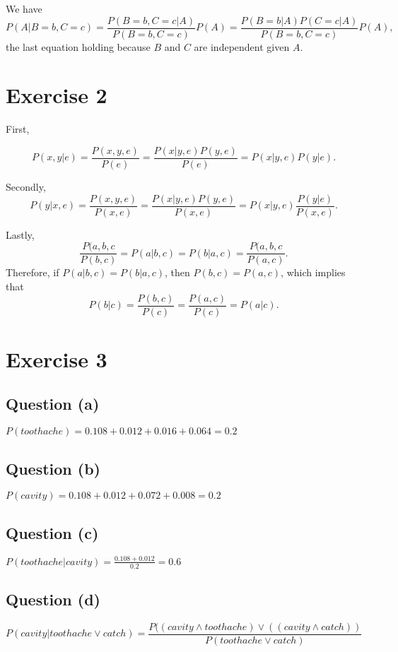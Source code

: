 \documentclass{article}
\begin{document}
\bigskip
We have 
\begin{equation}
P(A|B=b, C=c) = \frac{P(B=b, C=c |A)}{P(B=b, C=c)}P(A)=\frac{P(B=b|A)P(C=c|A)}{P(B=b, C=c)}P(A),
\end{equation}
the  last equation holding because $B$ and $C$ are independent given $A$. 

\section{Exercise 2}

First, 

\begin{equation}
P(x,y|e)= \frac{P(x,y,e)}{P(e)}= \frac{P(x|y, e)P(y, e)}{P(e)}= P(x|y, e)P(y|e).
\end{equation}

Secondly, 
\begin{equation}
P(y|x, e)= \frac{P(x,y,e)}{P(x, e)}= \frac{P(x|y, e)P(y, e)}{P(x,e)}= P(x|y, e)\frac{P(y|e)}{P(x, e)}.
\end{equation}

Lastly,
\begin{equation}
\frac{P(a,b,c}{P(b,c)}=P(a|b,c)=P(b|a, c)= \frac{P(a,b,c}{P(a,c)}.
\end{equation}
Therefore, if $P(a|b,c)=P(b|a, c)$, then $P(b,c)=P(a,c)$, which implies that
\begin{equation}
P(b|c)=\frac{P(b,c)}{P(c)}=\frac{P(a,c)}{P(c)}= P(a|c).
\end{equation}

\section{Exercise 3}
\subsection{Question (a)}
$P(toothache)=0.108 + 0.012 + 0.016 + 0.064=0.2$

\subsection{Question (b)}
$P(cavity)=0.108 + 0.012 + 0.072 + 0.008=0.2$

\subsection{Question (c)}
$P(toothache | cavity)=\frac{0.108 + 0.012}{0.2}=0.6$

\subsection{Question (d)}
$$P(cavity|toothache \lor catch)=\frac{P((cavity \land toothache) \lor ((cavity \land catch))}{P(toothache \lor catch)}$$
\end{document}
